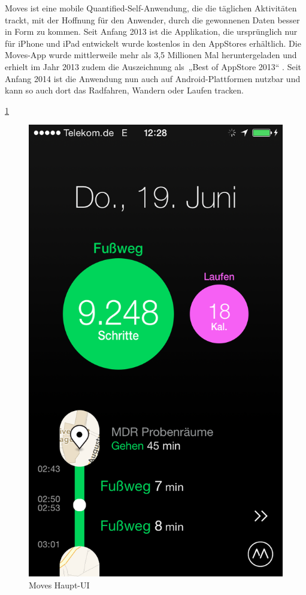 Moves ist eine mobile Quantified-Self-Anwendung, die die täglichen Aktivitäten trackt, mit der Hoffnung für den Anwender, durch die gewonnenen Daten besser in Form zu kommen. 
Seit Anfang 2013 ist die Applikation, die ursprünglich nur für iPhone und iPad entwickelt wurde kostenlos in den AppStores erhältlich. 
Die Moves-App wurde mittlerweile mehr als 3,5 Millionen Mal heruntergeladen und erhielt im Jahr 2013 zudem die Auszeichnung als\ „Best of AppStore 2013“ .
Seit Anfang 2014 ist die Anwendung nun auch auf Android-Plattformen nutzbar und kann so auch dort das Radfahren, Wandern oder Laufen tracken.

\ref{fig:Haupt-UI}

\begin{figure}[h]
\centering
\includegraphics[scale=0.3]{images/moves-app-main-ui.PNG}
\caption{Moves Haupt-UI \cite{fig:Haupt-UI}}
\label{fig:Haupt-UI}
\end{figure}

